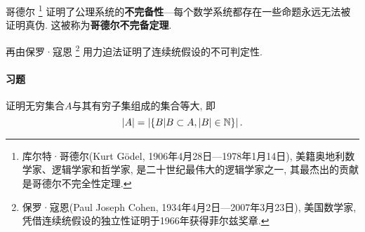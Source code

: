 \documentclass[UTF8]{mathrep}
\begin{document}
哥德尔
\footnote{库尔特·哥德尔(Kurt Gödel, 1906年4月28日—1978年1月14日),
美籍奥地利数学家、逻辑学家和哲学家, 是二十世纪最伟大的逻辑学家之一, 其最杰出的贡献是哥德尔不完全性定理. }
证明了公理系统的\textbf{不完备性}---每个数学系统都存在一些命题永远无法被证明真伪.
这被称为\textbf{哥德尔不完备定理}.

再由保罗·寇恩
\footnote{保罗·寇恩(Paul Joseph Cohen, 1934年4月2日---2007年3月23日), 美国数学家,
凭借连续统假设的独立性证明于1966年获得菲尔兹奖章. }
用力迫法证明了连续统假设的不可判定性.

\paragraph{习题}
证明无穷集合$A$与其有穷子集组成的集合等大, 即
\[
  \left\lvert A \right\rvert = \left\lvert  \{ B| B \subset A, \left\lvert B \right\rvert \in \mathbb{N} \}   \right\rvert
.\]

\end{document}
